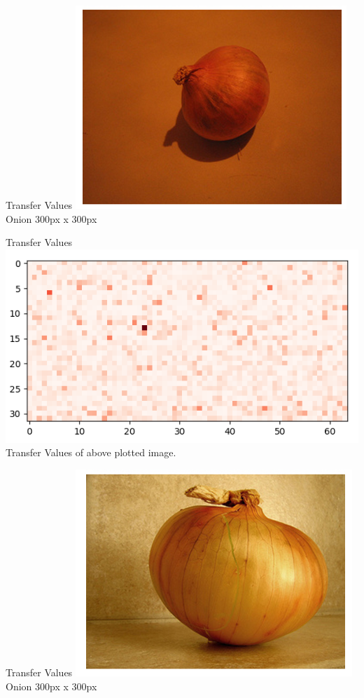 \documentclass[10pt, a4paper,xcolor=table]{beamer}
\begin{document}
\begin{frame}{Transfer Values}
	\includegraphics[scale=0.65]{onion1.png} \\
	\centering
	Onion 300px x 300px
\end{frame}


\begin{frame}{Transfer Values}
	\includegraphics[scale=0.5]{onion1trans.png} \\
	\centering
	Transfer Values of above plotted image.
\end{frame}


\begin{frame}{Transfer Values}
	\includegraphics[scale=0.7]{onion2.png} \\
	\centering
	Onion 300px x 300px
\end{frame}
\end{document}
